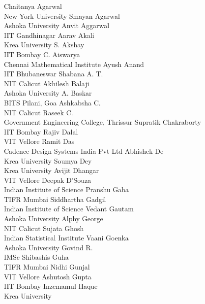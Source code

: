 \documentclass[a4paper,UKenglish]{dagrep-v2021}
\begin{document}
\begin{participants}
\participant Chaitanya Agarwal\\ New York University
\participant Smayan Agarwal\\ Ashoka University
\participant Anvit Aggarwal\\ IIT Gandhinagar
\participant Aarav Akali\\ Krea University
\participant S. Akshay\\ IIT Bombay
\participant C. Aiswarya\\ Chennai Mathematical Institute
\participant Ayush Anand\\ IIT Bhubaneswar
\participant Shabana A. T.\\ NIT Calicut
\participant Akhilesh Balaji\\ Ashoka University
\participant A. Baskar\\ BITS Pilani, Goa
\participant Ashkabsha C.\\ NIT Calicut
\participant Raseek C.\\ Government Engineering College, Thrissur
\participant Supratik Chakraborty\\ IIT Bombay
\participant Rajiv Dalal\\ VIT Vellore
\participant Ramit Das\\ Cadence Design Systems India Pvt Ltd
\participant Abhishek De\\ Krea University
\participant Soumya Dey\\ Krea University
\participant Avijit Dhangar\\ VIT Vellore
\participant Deepak D'Souza\\ Indian Institute of Science
\participant Pranshu Gaba\\ TIFR Mumbai
\participant Siddhartha Gadgil\\ Indian Institute of Science
\participant Vedant Gautam\\ Ashoka University
\participant Alphy George\\ NIT Calicut
\participant Sujata Ghosh\\ Indian Statistical Institute
\participant Vaani Goenka\\ Ashoka University
\participant Govind R.\\ IMSc
\participant Shibashis Guha\\ TIFR Mumbai
\participant Nidhi Gunjal\\ VIT Vellore
\participant Ashutosh Gupta\\ IIT Bombay
\participant Inzemamul Haque\\ Krea University

\end{participants}
\end{document}
